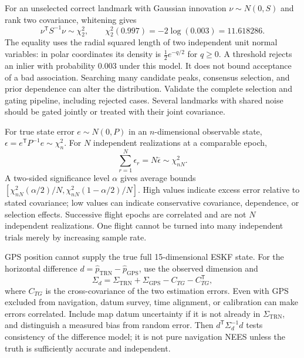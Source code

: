 \documentclass[11pt,a4paper]{article}
\numberwithin{equation}{section}
\begin{document}
For an unselected correct landmark with Gaussian innovation
$\nu\sim N(0,S)$ and rank two covariance, whitening gives
\begin{equation}
 \nu^{\mathsf T}S^{-1}\nu\sim\chi_2^2,\qquad
 \chi_2^2(0.997)=-2\log(0.003)=11.618286.
\end{equation}
The equality uses the radial squared length of two independent unit
normal variables: in polar coordinates its density is
$\tfrac12e^{-q/2}$ for $q\geq0$. A threshold rejects an inlier with
probability $0.003$ under this model. It does not bound acceptance of
a bad association. Searching many candidate peaks, consensus selection,
and prior dependence can alter the distribution. Validate the complete
selection and gating pipeline, including rejected cases. Several
landmarks with shared noise should be gated jointly or treated with
their joint covariance.

For true state error $e\sim N(0,P)$ in an $n$-dimensional observable
state, $\epsilon=e^{\mathsf T}P^{-1}e\sim\chi_n^2$. For $N$ independent
realizations at a comparable epoch,
\begin{equation}
 \sum_{r=1}^N\epsilon_r=N\overline\epsilon\sim\chi_{nN}^2.
\end{equation}
A two-sided significance level $\alpha$ gives average bounds
$[\chi_{nN}^2(\alpha/2)/N,
\chi_{nN}^2(1-\alpha/2)/N]$. High values indicate excess error relative
to stated covariance; low values can indicate conservative covariance,
dependence, or selection effects. Successive flight epochs are correlated
and are not $N$ independent realizations. One flight cannot be turned
into many independent trials merely by increasing sample rate.

GPS position cannot supply the true full 15-dimensional ESKF state.
For the horizontal difference $d=\widehat p_{\mathrm{TRN}}-
\widehat p_{\mathrm{GPS}}$, use the observed dimension and
\begin{equation}
 \Sigma_d=\Sigma_{\mathrm{TRN}}+\Sigma_{\mathrm{GPS}}
               -C_{TG}-C_{TG}^{\mathsf T},
\end{equation}
where $C_{TG}$ is the cross-covariance of the two estimation errors.
Even with GPS excluded from navigation, datum survey, time alignment,
or calibration can make errors correlated. Include map datum uncertainty
if it is not already in $\Sigma_{\mathrm{TRN}}$, and distinguish a measured
bias from random error. Then $d^{\mathsf T}\Sigma_d^{-1}d$ tests
consistency of the difference model; it is not pure navigation NEES
unless the truth is sufficiently accurate and independent.
\end{document}

